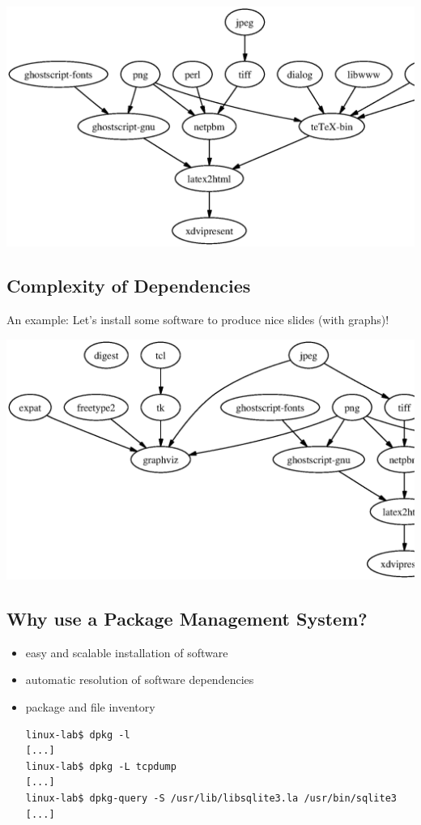 \documentclass[xga]{xdvislides}
\begin{document}
\vspace*{\fill}
\begin{center}
	\includegraphics[scale=0.8]{pics/xdvipresent.3.ps}
\end{center}

\subsection{Complexity of Dependencies}
An example: Let's install some software to produce nice slides (with
graphs)! \\

\vspace*{\fill}
\begin{center}
	\includegraphics[scale=0.65]{pics/xdvipresent.graphviz.ps}
\end{center}



\subsection{Why use a Package Management System?}
\begin{itemize}
	\item easy and scalable installation of software
	\item automatic resolution of software dependencies
	\item package and file inventory \\
\begin{verbatim}
linux-lab$ dpkg -l
[...]
linux-lab$ dpkg -L tcpdump
[...]
linux-lab$ dpkg-query -S /usr/lib/libsqlite3.la /usr/bin/sqlite3
[...]

\end{verbatim}
\end{itemize}
\end{document}
